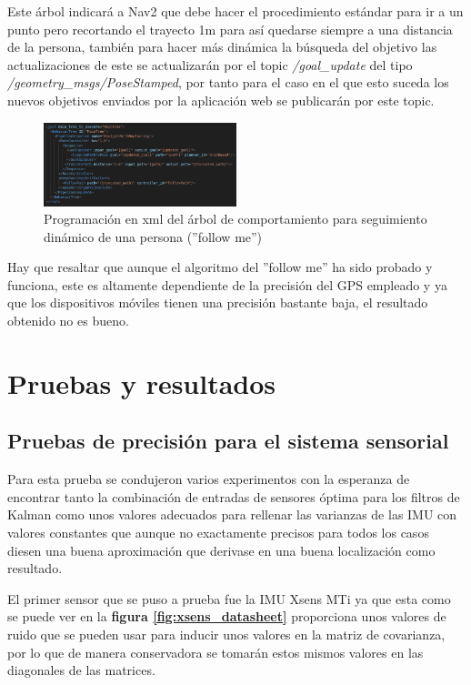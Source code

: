 Este árbol indicará a Nav2 que debe hacer el procedimiento estándar para ir a un punto pero recortando el trayecto 1m para así quedarse siempre a una distancia de la persona, también para hacer más dinámica 
la búsqueda del objetivo las actualizaciones de este se actualizarán por el topic \textit{/goal\_update} del tipo \textit{/geometry\_msgs/PoseStamped}, por tanto 
para el caso en el que esto suceda los nuevos objetivos enviados por la aplicación web se publicarán por este topic.

\begin{figure}[H]
    \centering
    \includegraphics[width=0.5\textwidth]{images/dynamic_object_bt.png}
    \caption{Programación en xml del árbol de comportamiento para seguimiento dinámico de una persona (''follow me'')}
    \label{fig:follow_me}
\end{figure}

Hay que resaltar que aunque el algoritmo del ''follow me'' ha sido probado y funciona, este es altamente dependiente de la precisión del GPS 
empleado y ya que los dispositivos móviles tienen una precisión bastante baja, el resultado obtenido no es bueno.
\cleardoublepage
\chapter{Pruebas y resultados}

\section{Pruebas de precisión para el sistema sensorial}
Para esta prueba se condujeron varios experimentos con la esperanza de encontrar tanto la combinación de entradas de sensores óptima para los filtros de 
Kalman como unos valores adecuados para rellenar las varianzas de las IMU con valores constantes que aunque no exactamente precisos para todos los casos diesen una buena aproximación 
que derivase en una buena localización como resultado.

El primer sensor que se puso a prueba fue la IMU Xsens MTi ya que esta como se puede ver en la \textbf{figura \ref{fig:xsens_datasheet}} proporciona 
unos valores de ruido que se pueden usar para inducir unos valores en la matriz de covarianza, por lo que de manera conservadora se tomarán 
estos mismos valores en las diagonales de las matrices.


